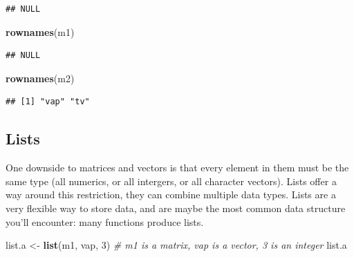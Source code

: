 \documentclass[]{article}
\newenvironment{Shaded}{\begin{snugshade}}{\end{snugshade}}
\newcommand{\KeywordTok}[1]{\textcolor[rgb]{0.13,0.29,0.53}{\textbf{#1}}}
\newcommand{\DecValTok}[1]{\textcolor[rgb]{0.00,0.00,0.81}{#1}}
\newcommand{\StringTok}[1]{\textcolor[rgb]{0.31,0.60,0.02}{#1}}
\newcommand{\CommentTok}[1]{\textcolor[rgb]{0.56,0.35,0.01}{\textit{#1}}}
\newcommand{\NormalTok}[1]{#1}
\begin{document}
\begin{verbatim}
## NULL
\end{verbatim}

\begin{Shaded}
\begin{Highlighting}[]
\KeywordTok{rownames}\NormalTok{(m1)}
\end{Highlighting}
\end{Shaded}

\begin{verbatim}
## NULL
\end{verbatim}

\begin{Shaded}
\begin{Highlighting}[]
\KeywordTok{rownames}\NormalTok{(m2)}
\end{Highlighting}
\end{Shaded}

\begin{verbatim}
## [1] "vap" "tv"
\end{verbatim}

\clearpage

\subsection{Lists}\label{lists}

One downside to matrices and vectors is that every element in them must
be the same type (all numerics, or all intergers, or all character
vectors). Lists offer a way around this restriction, they can combine
multiple data types. Lists are a very flexible way to store data, and
are maybe the most common data structure you'll encounter: many
functions produce lists.

\begin{Shaded}
\begin{Highlighting}[]
\NormalTok{list.a <-}\StringTok{ }\KeywordTok{list}\NormalTok{(m1, vap, }\DecValTok{3}\NormalTok{) }\CommentTok{# m1 is a matrix, vap is a vector, 3 is an integer}
\NormalTok{list.a}
\end{Highlighting}
\end{Shaded}
\end{document}
